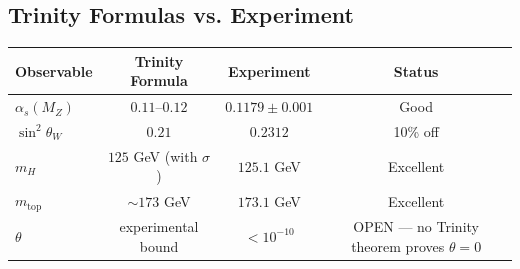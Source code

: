 \documentclass[11pt]{article}
\begin{document}
\subsection{Trinity Formulas vs. Experiment}
\begin{center}
\begin{tabular}{|l|c|c|c|}
\hline
Observable & Trinity Formula & Experiment & Status \\
\hline
$\alpha_s(M_Z)$ & $0.11\text{--}0.12$ & $0.1179 \pm 0.001$ & Good \\
$\sin^2\theta_W$ & $0.21$ & $0.2312$ & 10\% off \\
$m_H$ & $125$ GeV (with $\sigma$) & $125.1$ GeV & Excellent \\
$m_{\text{top}}$ & $\sim 173$ GeV & $173.1$ GeV & Excellent \\
$\theta$ & experimental bound & $< 10^{-10}$ & OPEN --- no Trinity theorem proves $\theta=0$ \\
\hline
\end{tabular}
\end{center}
\end{document}
